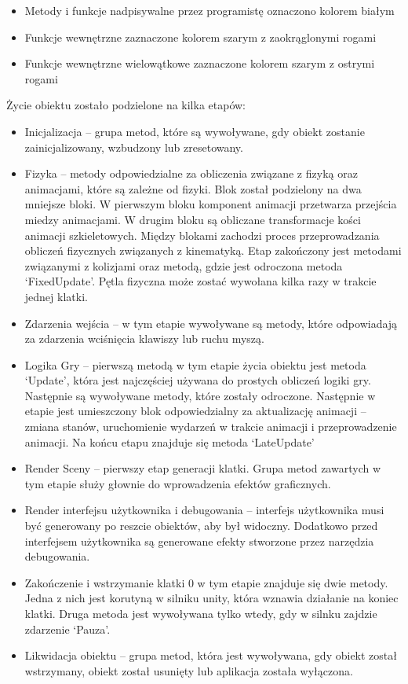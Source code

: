 \documentclass[12pt,twoside]{article}
\begin{document}
\begin{itemize}
    \item Metody i funkcje nadpisywalne przez programistę oznaczono kolorem białym
    \item Funkcje wewnętrzne zaznaczone kolorem szarym z zaokrąglonymi rogami
    \item Funkcje wewnętrzne wielowątkowe zaznaczone kolorem szarym z ostrymi
    rogami
\end{itemize}

Życie obiektu zostało podzielone na kilka etapów:
\begin{itemize}
\item Inicjalizacja – grupa metod, które są wywoływane, gdy obiekt zostanie
zainicjalizowany, wzbudzony lub zresetowany.
\item Fizyka – metody odpowiedzialne za obliczenia związane z fizyką oraz
animacjami, które są zależne od fizyki. Blok został podzielony na dwa mniejsze
bloki. W pierwszym bloku komponent animacji przetwarza przejścia miedzy
animacjami. W drugim bloku są obliczane transformacje kości animacji
szkieletowych. Między blokami zachodzi proces przeprowadzania obliczeń
fizycznych związanych z kinematyką. Etap zakończony jest metodami związanymi z
kolizjami oraz metodą, gdzie jest odroczona metoda ‘FixedUpdate’. Pętla fizyczna
może zostać wywołana kilka razy w trakcie jednej klatki. 
\item Zdarzenia wejścia – w tym etapie wywoływane są metody, które odpowiadają
za zdarzenia wciśnięcia klawiszy lub ruchu myszą. 
\item Logika Gry – pierwszą metodą w tym etapie życia obiektu jest metoda
‘Update’, która jest najczęściej używana do prostych obliczeń logiki gry.
Następnie są wywoływane metody, które zostały odroczone. Następnie w etapie jest
umieszczony blok odpowiedzialny za aktualizację animacji – zmiana stanów,
uruchomienie wydarzeń w trakcie animacji i przeprowadzenie animacji. Na końcu
etapu znajduje się metoda ‘LateUpdate’
\item Render Sceny – pierwszy etap generacji klatki. Grupa metod zawartych w tym
etapie służy głownie do wprowadzenia efektów graficznych.
\item Render interfejsu użytkownika i debugowania – interfejs użytkownika musi
być generowany po reszcie obiektów, aby był widoczny. Dodatkowo przed
interfejsem użytkownika są generowane efekty stworzone przez narzędzia
debugowania. 
\item Zakończenie i wstrzymanie klatki 0 w tym etapie znajduje się dwie metody.
Jedna z nich jest korutyną w silniku unity, która wznawia działanie na koniec
klatki. Druga metoda jest wywoływana tylko wtedy, gdy w silnku zajdzie zdarzenie
‘Pauza’.
\item Likwidacja obiektu – grupa metod, która jest wywoływana, gdy obiekt został
wstrzymany, obiekt został usunięty lub aplikacja została wyłączona. 
\end{itemize}
\end{document}
